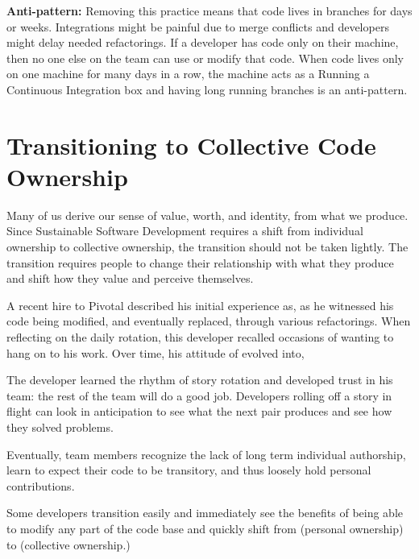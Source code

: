 \begin{table}[]
\textbf{Anti-pattern:} Removing this practice means that code lives in branches for days or weeks. Integrations might be painful due to merge conflicts and developers might delay needed refactorings. If a developer has code only on their machine, then no one else on the team can use or modify that code. When code lives only on one machine for many days in a row, the machine acts as a  Running a Continuous Integration box and having long running branches is an anti-pattern.
\section{Transitioning to Collective Code Ownership}
\label{Transitioning}
Many of us derive our sense of value, worth, and identity, from what we produce. Since Sustainable Software Development requires a shift from individual ownership to collective ownership, the transition should not be taken lightly. The transition requires people to change their relationship with what they produce and shift how they value and perceive themselves. 

A recent hire to Pivotal described his initial experience as,  as he witnessed his code being modified, and eventually replaced, through various refactorings. When reflecting on the daily rotation, this developer recalled occasions of wanting to hang on to his work.  Over time, his attitude of  evolved into,  

The developer learned the rhythm of story rotation and developed trust in his team: the rest of the team will do a good job. Developers rolling off a story in flight can look in anticipation to see what the next pair produces and see how they solved problems. 

Eventually, team members recognize the lack of long term individual authorship, learn to expect their code to be transitory, and thus loosely hold personal contributions.   

Some developers transition easily and immediately see the benefits of being able to modify any part of the code base and quickly shift from  (personal ownership) to  (collective ownership.)


\end{table}
